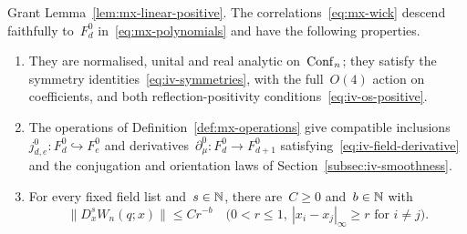 \begin{proposition}\label{prop:mx-free}
Grant Lemma~\ref{lem:mx-linear-positive}.
The correlations~\eqref{eq:mx-wick} descend faithfully to~$F_d^0$ in~\eqref{eq:mx-polynomials} and have the following properties.
\begin{enumerate}[label=\textup{(\roman*)},ref=\theproposition(\roman*)]
\item\label{item:mx-laws} They are normalised, unital and real analytic on~$\operatorname{Conf}_{n}$; they satisfy the symmetry identities~\eqref{eq:iv-symmetries}, with the full~$O(4)$ action on coefficients, and both reflection-positivity conditions~\eqref{eq:iv-os-positive}.
\item\label{item:mx-calculus} The operations of Definition~\ref{def:mx-operations} give compatible inclusions~$j^0_{d,e}:F_d^0\hookrightarrow F_e^0$ and derivatives~$\partial_\mu^0:F_d^0\to F_{d+1}^0$ satisfying~\eqref{eq:iv-field-derivative} and the conjugation and orientation laws of Section~\ref{subsec:iv-smoothness}.
\item\label{item:mx-bounds} For every fixed field list and~$s\in\mathbb N$, there are~$C\ge0$ and~$b\in\mathbb N$ with
\begin{equation}\label{eq:mx-bounds}
 \|D_x^sW_n(q;x)\|\le Cr^{-b}
 \quad\bigl(0<r\le1,\ |x_i-x_j|_\infty\ge r\text{ for }i\ne j\bigr).
\end{equation}
\end{enumerate}
\end{proposition}

